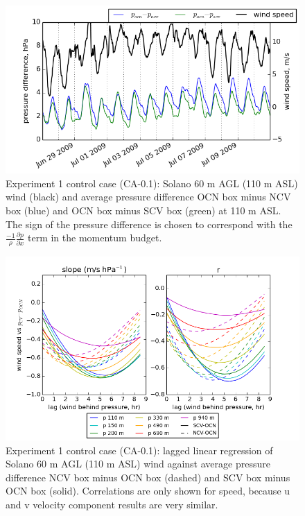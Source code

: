 \begin{figure}[here]
\includegraphics[width=1\textwidth]{ch3-wind/img/pgrad_wind_CA0pt1_level110.png}
\caption{Experiment 1 control case (CA-0.1): Solano 60 m AGL (110 m ASL) wind (black) and average pressure difference OCN box minus NCV box (blue) and OCN box minus SCV box (green) at 110 m ASL.  The sign of the pressure difference is chosen to correspond with the $\frac{-1}{\rho} \frac{\partial p}{\partial x}$ term in the momentum budget.}
\label{fig:windSol_PgradWind}
\end{figure}

\begin{figure}[here]
\includegraphics[width=1\textwidth]{ch3-wind/img/lag_corr_pdiff_combo_ncv_scv_d02_CA0pt1.png}
\caption{Experiment 1 control case (CA-0.1): lagged linear regression of Solano 60 m AGL (110 m ASL) wind against average pressure difference NCV box minus OCN box (dashed) and SCV box minus OCN box (solid).  Correlations are only shown for speed, because u and v velocity component results are very similar.}
\label{fig:windSol_LagCorrCtrl}
\end{figure}

